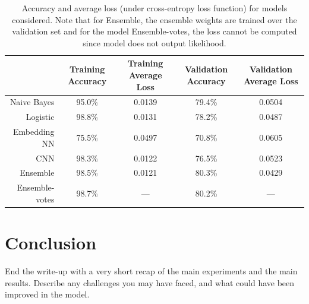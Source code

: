 \documentclass[11pt]{article}
\begin{document}

\begin{landscape}
  \begin{table}[t]
\centering
\begin{tabular}{rcccc}
\toprule
{} & Training Accuracy &  Training Average Loss & Validation Accuracy &  Validation Average Loss \\
\midrule
Naive Bayes    &             95.0\% &                 0.0139 &               79.4\% &                   0.0504 \\
Logistic       &             98.8\% &                 0.0131 &               78.2\% &                   0.0487 \\
Embedding NN   &             75.5\% &                 0.0497 &               70.8\% &                   0.0605 \\
CNN            &             98.3\% &                 0.0122 &               76.5\% &                   0.0523 \\
Ensemble       &             98.5\% &                 0.0121 &               80.3\% &                   0.0429 \\
Ensemble-votes &             98.7\% &                    --- &               80.2\% &                      --- \\
\bottomrule
\end{tabular}
\caption{\label{tab:results} Accuracy and average loss (under cross-entropy loss
function) for models considered. Note that for Ensemble, the ensemble weights
are
trained over the validation set and for the model Ensemble-votes, the loss
cannot be computed since model does not output likelihood.}
\end{table}


\end{landscape}



\section{Conclusion}

End the write-up with a very short recap of the main experiments and the main
results. Describe any challenges you may have faced, and what could have been
improved in the model.



\end{document}
